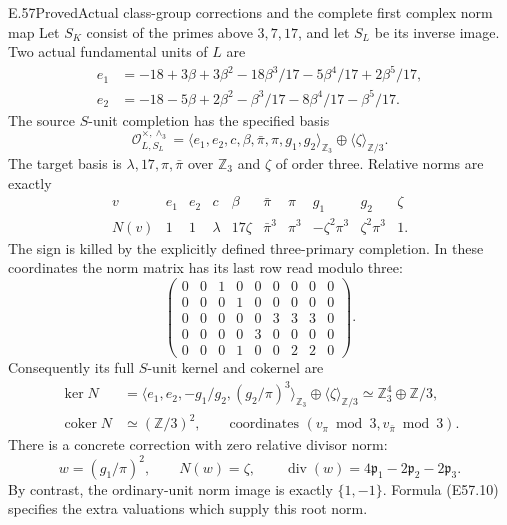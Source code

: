 \begin{statement}{E.57}{Proved}{Actual class-group corrections and the complete first complex norm map}
Let $S_K$ consist of the primes above $3,7,17$,
and let $S_L$ be its inverse image. Two actual
fundamental units of $L$ are
\[
 \begin{aligned}
 e_1&=-18+3\beta+3\beta^2
              -18\beta^3/17-5\beta^4/17+2\beta^5/17,\\
 e_2&=-18-5\beta+2\beta^2
              -\beta^3/17-8\beta^4/17-\beta^5/17.
 \end{aligned}
 \tag{E57.5}
\]
The source $S$-unit completion has the specified
basis
\[
 \mathcal O_{L,S_L}^{\times,\wedge_3}
   =\langle e_1,e_2,c,\beta,\bar\pi,\pi,g_1,g_2\rangle_{\mathbb Z_3}
                                \oplus\langle\zeta\rangle_{\mathbb Z/3}.
 \tag{E57.6}
\]
The target basis is
$\lambda,17,\pi,\bar\pi$ over $\mathbb Z_3$ and
$\zeta$ of order three. Relative norms are exactly
\[
 \begin{array}{c|ccccccccc}
 v&e_1&e_2&c&\beta&\bar\pi&\pi&g_1&g_2&\zeta\\ \hline
 N(v)&1&1&\lambda&17\zeta&\bar\pi^3&\pi^3&
                   -\zeta^2\pi^3&\zeta^2\pi^3&1 .
 \end{array}
 \tag{E57.7}
\]
The sign is killed by the explicitly defined
three-primary completion. In these coordinates
the norm matrix has its last row read modulo three:
\[
 \begin{pmatrix}
 0&0&1&0&0&0&0&0&0\\
 0&0&0&1&0&0&0&0&0\\
 0&0&0&0&0&3&3&3&0\\
 0&0&0&0&3&0&0&0&0\\
 0&0&0&1&0&0&2&2&0
 \end{pmatrix}.
 \tag{E57.8}
\]
Consequently its full $S$-unit kernel and cokernel
are
\[
 \begin{aligned}
 \ker N&=
  \langle e_1,e_2,-g_1/g_2,(g_2/\pi)^3\rangle_{\mathbb Z_3}
                         \oplus\langle\zeta\rangle_{\mathbb Z/3}
       \simeq\mathbb Z_3^4\oplus\mathbb Z/3,\\
 \operatorname{coker}N&\simeq(\mathbb Z/3)^2,
           \qquad\text{coordinates }(v_\pi\bmod3,v_{\bar\pi}\bmod3).
 \end{aligned}
 \tag{E57.9}
\]
There is a concrete correction with zero relative
divisor norm:
\[
 w=(g_1/\pi)^2,\qquad
 N(w)=\zeta,\qquad
 \operatorname{div}(w)=
     4\mathfrak p_1-2\mathfrak p_2-2\mathfrak p_3 .
 \tag{E57.10}
\]
By contrast, the ordinary-unit norm image is
exactly $\{1,-1\}$. Formula (E57.10) specifies
the extra valuations which supply this root norm.


\end{statement}
